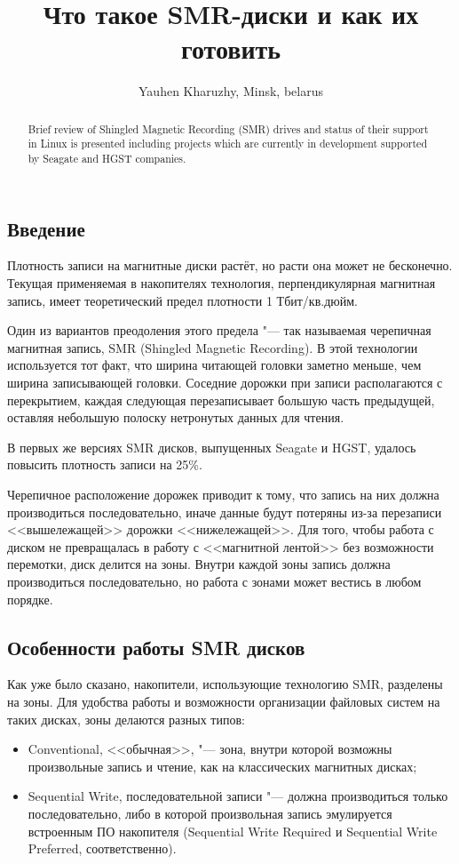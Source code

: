 \documentclass[10pt, a5paper]{article}
\begin{document}
\title{Что такое SMR-диски и как их готовить}
\author{Yauhen Kharuzhy, Minsk, belarus}
\maketitle
\begin{abstract}
Brief review of Shingled Magnetic Recording (SMR) drives and status of their support in Linux is presented including projects which are currently in development supported by Seagate and HGST companies.
\end{abstract}
\subsection*{Введение}

Плотность записи на магнитные диски растёт, но расти она может не бесконечно. Текущая применяемая в накопителях технология, перпендикулярная магнитная запись, имеет теоретический предел плотности 1 Тбит/кв.дюйм.

Один из вариантов преодоления этого предела "--- так называемая черепичная магнитная запись, SMR (Shingled Magnetic \linebreak Recording). В этой технологии используется тот факт, что ширина читающей головки заметно меньше, чем ширина записывающей головки. Соседние дорожки при записи располагаются с перекрытием, каждая следующая перезаписывает большую часть предыдущей, оставляя небольшую полоску нетронутых данных для чтения.

В первых же версиях SMR дисков, выпущенных Seagate и HGST, удалось повысить плотность записи на 25\%.

Черепичное расположение дорожек приводит к тому, что запись на них должна производиться последовательно, иначе данные будут потеряны из-за перезаписи <<вышележащей>> дорожки <<нижележащей>>. Для того, чтобы работа с диском не превращалась в работу с <<магнитной лентой>> без возможности перемотки, диск делится на зоны. Внутри каждой зоны запись должна производиться последовательно, но работа с зонами может вестись в любом порядке.

\subsection*{Особенности работы SMR дисков}

Как уже было сказано, накопители, использующие технологию SMR, разделены на зоны. Для удобства работы и возможности организации файловых систем на таких дисках, зоны делаются разных типов:
\begin{itemize}
  \item Conventional, <<обычная>>, "--- зона, внутри которой возможны произвольные запись и чтение, как на классических магнитных дисках;
  \item Sequential Write, последовательной записи "--- должна производиться только последовательно, либо в которой произвольная запись эмулируется встроенным ПО накопителя (Sequential Write Required и Sequential Write Preferred, соответственно).
\end{itemize}
\end{document}
